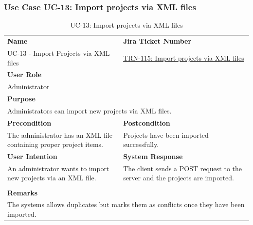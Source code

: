 \subsubsection{Use Case UC-13: Import projects via XML files}\label{subsubsec:use-case-uc-13:-import-projects-via-xml-files}

\begin{table}[H]
    \centering
    \begin{tabular}{|p{}|p{}|}

        \hline
        \rowcolor{gray!50}\textbf{Name} & \rowcolor{gray!50}\textbf{Jira Ticket Number} \\
        UC-13 - Import Projects via XML files
        &
        \href{https://fh-burgenland.atlassian.net/browse/TRN-115}{TRN-115: Import projects via XML files} \\ \hline

        \multicolumn{2}{|l|}{\rowcolor{gray!50}\textbf{User Role}} \\
        \multicolumn{2}{|l|}{Administrator} \\ \hline

        \multicolumn{2}{|l|}{\rowcolor{gray!50}\textbf{Purpose}} \\
        \multicolumn{2}{|l|}{Administrators can import new projects via XML files.} \\ \hline

        \rowcolor{gray!50}\textbf{Precondition} & \rowcolor{gray!50}\textbf{Postcondition} \\
        The administrator has an XML file containing proper project items.
        &
        Projects have been imported successfully.\\ \hline

        \rowcolor{gray!50}\textbf{User Intention} & \rowcolor{gray!50}\textbf{System Response} \\
        An administrator wants to import new projects via an XML file.
        &
        The client sends a POST request to the server and the projects are imported. \\ \hline

        & \\ \hline

        \multicolumn{2}{|l|}{\rowcolor{gray!50}\textbf{Remarks}} \\
        \multicolumn{2}{|p{1\textwidth}|}{The systems allows duplicates but marks them as conflicts once they have been imported.} \\ \hline
    \end{tabular}
    \caption{UC-13: Import projects via XML files}
    \label{tab:uc-import-projects-via-xml-files}
\end{table}

